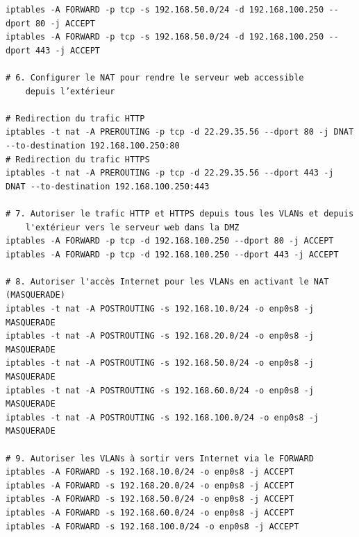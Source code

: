 \documentclass[a4paper,12pt,openany]{report}
\begin{document}
\begin{verbatim}
iptables -A FORWARD -p tcp -s 192.168.50.0/24 -d 192.168.100.250 --dport 80 -j ACCEPT
iptables -A FORWARD -p tcp -s 192.168.50.0/24 -d 192.168.100.250 --dport 443 -j ACCEPT

# 6. Configurer le NAT pour rendre le serveur web accessible 
    depuis l’extérieur

# Redirection du trafic HTTP
iptables -t nat -A PREROUTING -p tcp -d 22.29.35.56 --dport 80 -j DNAT --to-destination 192.168.100.250:80
# Redirection du trafic HTTPS
iptables -t nat -A PREROUTING -p tcp -d 22.29.35.56 --dport 443 -j DNAT --to-destination 192.168.100.250:443

# 7. Autoriser le trafic HTTP et HTTPS depuis tous les VLANs et depuis 
    l'extérieur vers le serveur web dans la DMZ
iptables -A FORWARD -p tcp -d 192.168.100.250 --dport 80 -j ACCEPT
iptables -A FORWARD -p tcp -d 192.168.100.250 --dport 443 -j ACCEPT

# 8. Autoriser l'accès Internet pour les VLANs en activant le NAT (MASQUERADE)
iptables -t nat -A POSTROUTING -s 192.168.10.0/24 -o enp0s8 -j MASQUERADE 
iptables -t nat -A POSTROUTING -s 192.168.20.0/24 -o enp0s8 -j MASQUERADE 
iptables -t nat -A POSTROUTING -s 192.168.50.0/24 -o enp0s8 -j MASQUERADE 
iptables -t nat -A POSTROUTING -s 192.168.60.0/24 -o enp0s8 -j MASQUERADE 
iptables -t nat -A POSTROUTING -s 192.168.100.0/24 -o enp0s8 -j MASQUERADE 

# 9. Autoriser les VLANs à sortir vers Internet via le FORWARD 
iptables -A FORWARD -s 192.168.10.0/24 -o enp0s8 -j ACCEPT 
iptables -A FORWARD -s 192.168.20.0/24 -o enp0s8 -j ACCEPT 
iptables -A FORWARD -s 192.168.50.0/24 -o enp0s8 -j ACCEPT 
iptables -A FORWARD -s 192.168.60.0/24 -o enp0s8 -j ACCEPT 
iptables -A FORWARD -s 192.168.100.0/24 -o enp0s8 -j ACCEPT
            \end{verbatim}
\end{document}
